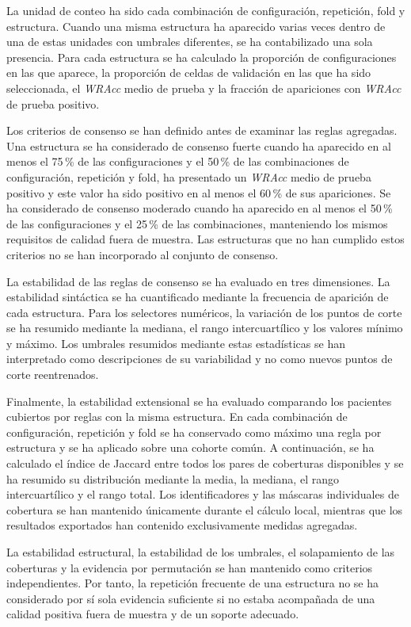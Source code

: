 La unidad de conteo ha sido cada combinación de configuración, repetición, fold y estructura. Cuando una misma estructura ha aparecido varias veces dentro de una de estas unidades con umbrales diferentes, se ha contabilizado una sola presencia. Para cada estructura se ha calculado la proporción de configuraciones en las que aparece, la proporción de celdas de validación en las que ha sido seleccionada, el \textit{WRAcc} medio de prueba y la fracción de apariciones con \textit{WRAcc} de prueba positivo.

Los criterios de consenso se han definido antes de examinar las reglas agregadas. Una estructura se ha considerado de consenso fuerte cuando ha aparecido en al menos el 75\,\% de las configuraciones y el 50\,\% de las combinaciones de configuración, repetición y fold, ha presentado un \textit{WRAcc} medio de prueba positivo y este valor ha sido positivo en al menos el 60\,\% de sus apariciones. Se ha considerado de consenso moderado cuando ha aparecido en al menos el 50\,\% de las configuraciones y el 25\,\% de las combinaciones, manteniendo los mismos requisitos de calidad fuera de muestra. Las estructuras que no han cumplido estos criterios no se han incorporado al conjunto de consenso.

La estabilidad de las reglas de consenso se ha evaluado en tres dimensiones. La estabilidad sintáctica se ha cuantificado mediante la frecuencia de aparición de cada estructura. Para los selectores numéricos, la variación de los puntos de corte se ha resumido mediante la mediana, el rango intercuartílico y los valores mínimo y máximo. Los umbrales resumidos mediante estas estadísticas se han interpretado como descripciones de su variabilidad y no como nuevos puntos de corte reentrenados.

Finalmente, la estabilidad extensional se ha evaluado comparando los pacientes cubiertos por reglas con la misma estructura. En cada combinación de configuración, repetición y fold se ha conservado como máximo una regla por estructura y se ha aplicado sobre una cohorte común. A continuación, se ha calculado el índice de Jaccard entre todos los pares de coberturas disponibles y se ha resumido su distribución mediante la media, la mediana, el rango intercuartílico y el rango total. Los identificadores y las máscaras individuales de cobertura se han mantenido únicamente durante el cálculo local, mientras que los resultados exportados han contenido exclusivamente medidas agregadas.

La estabilidad estructural, la estabilidad de los umbrales, el solapamiento de las coberturas y la evidencia por permutación se han mantenido como criterios independientes. Por tanto, la repetición frecuente de una estructura no se ha considerado por sí sola evidencia suficiente si no estaba acompañada de una calidad positiva fuera de muestra y de un soporte adecuado.


